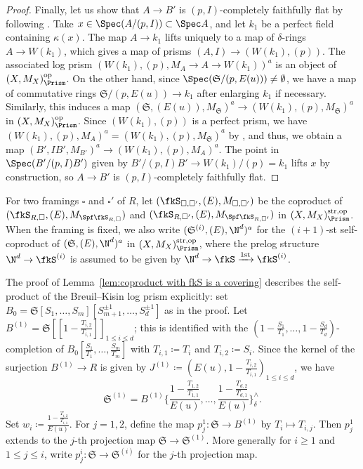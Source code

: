 \begin{proof}
Finally, let us show that  $A \rightarrow B'$ is $(p, I)$-completely faithfully flat by following \cite[Prop.~2.4.9]{Bhatt-Lurie-absoluteprismticcohomology}. 
Take $x \in \Spec (A/(p, I)) \subset \Spec  A$, and let $k_1$ be a perfect field containing $\kappa(x)$. The map $A \rightarrow k_1$ lifts uniquely to a map of $\delta$-rings $A \rightarrow W(k_1)$, which gives a map of prisms $(A, I) \rightarrow (W(k_1), (p))$. The associated log prism $(W(k_1), (p), M_A\rightarrow A\rightarrow W(k_1))^a$ is an object of $(X,M_X)_\Prism^\mathrm{op}$. On the other hand, since $\Spec (\mathfrak{S}/(p, E(u))) \neq \emptyset$, we have a map of commutative rings $\mathfrak{S}/(p, E(u)) \rightarrow k_1$ after enlarging $k_1$ if necessary. Similarly, this induces a map $(\mathfrak{S}, (E(u)), M_{\mathfrak{S}})^a \rightarrow (W(k_1), (p), M_{\mathfrak{S}})^a$ in $(X,M_X)_\Prism^\mathrm{op}$. Since $(W(k_1), (p))$ is a perfect prism, we have $(W(k_1), (p), M_A)^a = (W(k_1), (p), M_{\mathfrak{S}})^a$ by \cite[Lem.~2.17]{min-wang-HT-crys-log-prism}, and thus, we obtain a map $(B', IB', M_{B'})^a \rightarrow (W(k_1), (p), M_A)^a$. The point in $\Spec  (B'/(p, I)B')$ given by $B'/(p, I)B' \rightarrow W(k_1)/(p) = k_1$ lifts $x$ by construction, so $A \rightarrow B'$ is $(p, I)$-completely faithfully flat. 
\end{proof}

For two framings $\square$ and $\square'$ of $R$, let $(\fkS_{\square,\square'},(E),M_{\square,\square'})$ be the coproduct of $(\fkS_{R,\square},(E),M_{\Spf\fkS_{R,\square}})$ and $(\fkS_{R,\square'},(E),M_{\Spf\fkS_{R,\square'}})$ in $(X,M_X)_\Prism^{\mathrm{str},\mathrm{op}}$. When the framing is fixed, we also write $(\mathfrak{S}^{(i)},(E),\N^d)^a$ for the $(i+1)$-st self-coproduct of $(\mathfrak{S},(E),\N^d)^a$ in $(X,M_X)_\Prism^{\mathrm{str},\mathrm{op}}$, where the prelog structure $\N^d\rightarrow \fkS^{(i)}$ is assumed to be given by $\N^d\rightarrow \fkS\xrightarrow{\text{1st}}\fkS^{(i)}$. 

The proof of Lemma~\ref{lem:coproduct with fkS is a covering} describes the self-product of the Breuil--Kisin log prism explicitly: set $B_0 = \mathfrak{S}[S_1, \ldots, S_m][S_{m+1}^{\pm 1}, \ldots, S_{d}^{\pm 1}]$ as in the proof. Let $B^{(1)} = \mathfrak{S}[\![1-\frac{T_{i, 2}}{T_{i, 1}}]\!]_{1\leq i \leq d}$; this is identified with the $(1-\frac{S_1}{T_1}, \ldots, 1-\frac{S_d}{T_d})$-completion of $B_0[\frac{S_1}{T_1}, \ldots, \frac{S_m}{T_m}]$ with $T_{i, 1} \coloneqq T_i$ and $T_{i, 2} \coloneqq S_i$. Since the kernel of the surjection $B^{(1)}\rightarrow R$ is given by $J^{(1)}\coloneqq (E(u), 1-\frac{T_{i, 2}}{T_{i, 1}})_{1\leq i\leq d}$, we have
\[
\mathfrak{S}^{(1)} = B^{(1)}\biggl\{\frac{1-\frac{T_{1, 2}}{T_{1, 1}}}{E(u)}, \ldots, \frac{1-\frac{T_{d, 2}}{T_{d, 1}}}{E(u)}\biggr\}^{\wedge}_{\delta}. 
\]
Set $w_i \coloneqq \frac{1-\frac{T_{i ,2}}{T_{i, 1}}}{E(u)}$. For $j = 1, 2$, define the map $p^1_j\colon \mathfrak{S} \rightarrow B^{(1)}$ by $T_i \mapsto T_{i, j}$. Then $p^1_j$ extends to the $j$-th projection map $\mathfrak{S} \rightarrow \mathfrak{S}^{(1)}$. More generally for $i \geq 1$ and $1 \leq j \leq i$, write $p_j^i\colon \mathfrak{S} \rightarrow \mathfrak{S}^{(i)}$ for the $j$-th projection map.  

